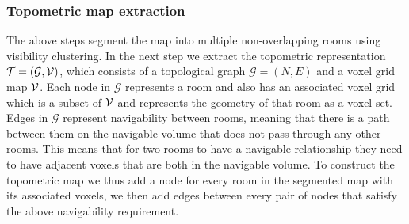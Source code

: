 \subsubsection{Topometric map extraction}
The above steps segment the map into multiple non-overlapping rooms using visibility clustering. In the next step we extract the topometric representation \(\mathcal{T} = (\mathcal{G}, \mathcal{V})\), which consists of a topological graph \(\mathcal{G}=(N,E)\) and a voxel grid map \(\mathcal{V}\). Each node in \(\mathcal{G}\) represents a room and also has an associated voxel grid which is a subset of \(\mathcal{V}\) and represents the geometry of that room as a voxel set. Edges in \(\mathcal{G}\) represent navigability between rooms, meaning that there is a path between them on the navigable volume that does not pass through any other rooms. This means that for two rooms to have a navigable relationship they need to have adjacent voxels that are both in the navigable volume. To construct the topometric map we thus add a node for every room in the segmented map with its associated voxels, we then add edges between every pair of nodes that satisfy the above navigability requirement.